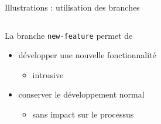 \begin{frame}[fragile]{%
\protect\hypertarget{illustrations-utilisation-des-branches}{%
Illustrations : utilisation des branches}}
\begin{columns}[T]
\begin{column}{0.60\textwidth}
La branche \texttt{new-feature} permet de

\begin{itemize}
\tightlist
\item
  développer une nouvelle fonctionnalité

  \begin{itemize}
  \tightlist
  \item
    intrusive
  \end{itemize}
\item
  conserver le développement normal

  \begin{itemize}
  \tightlist
  \item
    sans impact sur le processus
  \end{itemize}
\end{itemize}
\end{column}
\end{columns}

\end{frame}

